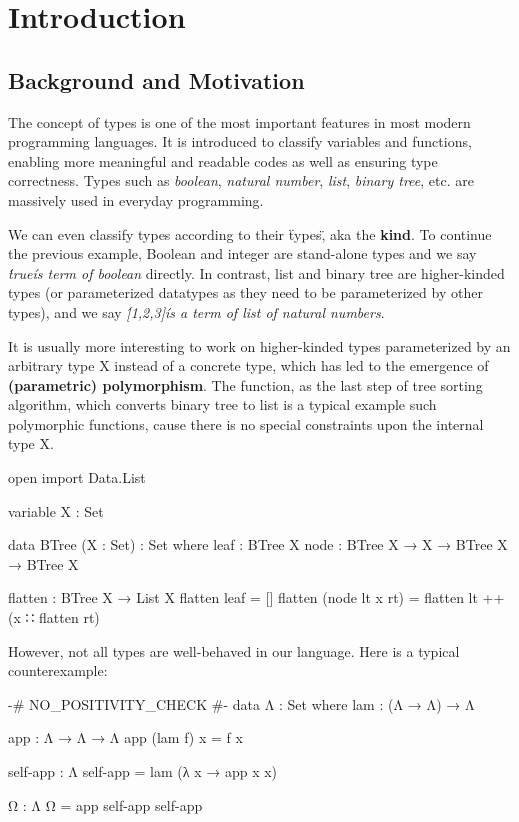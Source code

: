 \chapter{Introduction}

\section{Background and Motivation}

The concept of types is one of the most important features in most modern programming languages. It is introduced to classify variables and functions, enabling more meaningful and readable codes as well as ensuring type correctness. Types such as \textit{boolean}, \textit{natural number}, \textit{list}, \textit{binary tree}, etc. are massively used in everyday programming.

We can even classify types according to their \"types\", aka the \textbf{kind}. To continue the previous example, Boolean and integer are stand-alone types and we say \textit{\'true\' is term of boolean} directly. In contrast, list and binary tree are higher-kinded types (or parameterized datatypes as they need to be parameterized by other types), and we say \textit{\'[1,2,3]\' is a term of list of natural numbers}.

It is usually more interesting to work on higher-kinded types parameterized by an arbitrary type X instead of a concrete type, which has led to the emergence of \textbf{(parametric) polymorphism}. The  function, as the last step of tree sorting algorithm, which converts binary tree to list is a typical example such polymorphic functions, cause there is no special constraints upon the internal type X.

\begin{code}[hide]
open import Data.List

variable X : Set

data BTree (X : Set) : Set where
  leaf : BTree X
  node : BTree X → X → BTree X → BTree X
\end{code}

\begin{code}
flatten : BTree X → List X
flatten leaf = []
flatten (node lt x rt) = flatten lt ++ (x ∷ flatten rt)
\end{code}

However, not all types are well-behaved in our language. Here is a typical counterexample:

\begin{code}
{-# NO_POSITIVITY_CHECK #-}
data Λ : Set where
  lam : (Λ → Λ) → Λ

app : Λ → Λ → Λ
app (lam f) x = f x

self-app : Λ
self-app = lam (λ x → app x x)

Ω : Λ
Ω = app self-app self-app
\end{code}

